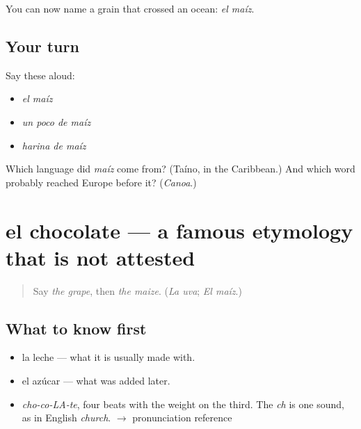 \begin{grammarlens}[title={What you've built}]
You can now name a grain that crossed an ocean: \emph{el maíz}.
\end{grammarlens}

\subsection*{Your turn}
Say these aloud:

\begin{itemize}
\raggedright
  \item \emph{el maíz}
  \item \emph{un poco de maíz}
  \item \emph{harina de maíz}
\end{itemize}

\begin{tcolorbox}[breakable,colback=teal!4,colframe=teal!35!black,title={Before you move on}]
Which language did \emph{maíz} come from? (Taíno, in the Caribbean.) And which word probably reached Europe before it? (\emph{Canoa}.)
\end{tcolorbox}
\section[el chocolate]{el chocolate — a famous etymology that is not attested}

\label{lesson:ES-C376-chocolate}



\begin{quote}
Say \emph{the grape}, then \emph{the maize}. (\emph{La uva}; \emph{El maíz}.)
\end{quote}

\subsection*{What to know first}
\begin{itemize}
\raggedright
  \item la leche — what it is usually made with.
  \item el azúcar — what was added later.
\end{itemize}

\begin{sounds}
\begin{itemize}
\raggedright
  \item \emph{cho-co-LA-te}, four beats with the weight on the third. The \emph{ch} is one sound, as in English \emph{church}. $\to$ pronunciation reference
\end{itemize}
\end{sounds}

